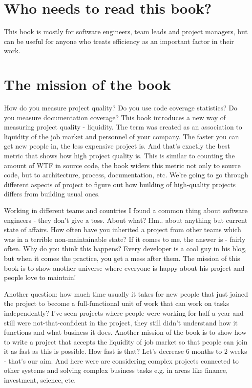 \section{Who needs to read this book?}
This book is mostly for software engineers, team leads and project managers, but can be useful for anyone who treats efficiency as an important factor in their work.

\section{The mission of the book}
How do you measure project quality? Do you use code coverage statistics? Do you measure documentation coverage? This book introduces a new way of measuring project quality - liquidity. The term was created as an association to liquidity of the job market and personnel of your company. The faster you can get new people in, the less expensive project is. And that's exactly the best metric that shows how high project quality is. This is similar to counting the amount of WTF in source code, the book widers this metric not only to source code, but to architecture, process, documentation, etc. We're going to go through different aspects of project to figure out how building of high-quality projects differs from building usual ones.

Working in different teams and countries I found a common thing about software engineers - they don't give a toss. About what? Hm.. about anything but current state of affairs. How often have you inherited a project from other teams which was in a terrible non-maintainable state? If it comes to me, the answer is - fairly often. Why do you think this happens? Every developer is a cool guy in his blog, but when it comes the practice, you get a mess after them. The mission of this book is to show another universe where everyone is happy about his project and people love to maintain! 

Another question: how much time usually it takes for new people that just joined the project to become a full-functional unit of work that can work on tasks independently? I've seen projects where people were working for half a year and still were not-that-confident in the project, they still didn't understand how it functions and what business it does. Another mission of the book is to show how to write a project that accepts the liquidity of job market so that people can join it as fast as this is possible. How fast is that? Let's decrease 6 months to 2 weeks - that's our aim. And here were are considering complex projects connected to other systems and solving complex business tasks e.g. in areas like finance, investment, science, etc.

